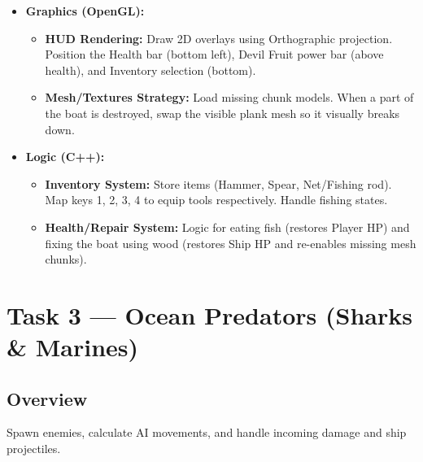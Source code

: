 \documentclass[12pt,a4paper]{article}
\begin{document}
\begin{itemize}[leftmargin=*]
    \item \textbf{Graphics (OpenGL):}
    \begin{itemize}
        \item \textbf{HUD Rendering:} Draw 2D overlays using Orthographic projection. Position the Health bar (bottom left), Devil Fruit power bar (above health), and Inventory selection (bottom).
        \item \textbf{Mesh/Textures Strategy:} Load missing chunk models. When a part of the boat is destroyed, swap the visible plank mesh so it visually breaks down.
    \end{itemize}
    \item \textbf{Logic (C++):}
    \begin{itemize}
        \item \textbf{Inventory System:} Store items (Hammer, Spear, Net/Fishing rod). Map keys 1, 2, 3, 4 to equip tools respectively. Handle fishing states.
        \item \textbf{Health/Repair System:} Logic for eating fish (restores Player HP) and fixing the boat using wood (restores Ship HP and re-enables missing mesh chunks).
    \end{itemize}
\end{itemize}

\section{Task 3 — Ocean Predators (Sharks \& Marines)}

\subsection{Overview}
Spawn enemies, calculate AI movements, and handle incoming damage and ship projectiles.
\end{document}
